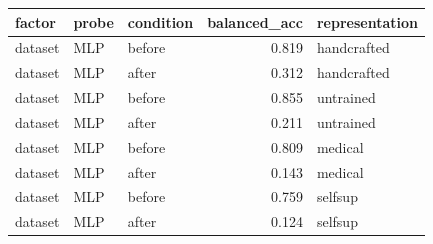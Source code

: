 \begin{tabular}{lllrl}
\toprule
factor & probe & condition & balanced\_acc & representation \\
\midrule
dataset & MLP & before & 0.819 & handcrafted \\
dataset & MLP & after & 0.312 & handcrafted \\
dataset & MLP & before & 0.855 & untrained \\
dataset & MLP & after & 0.211 & untrained \\
dataset & MLP & before & 0.809 & medical \\
dataset & MLP & after & 0.143 & medical \\
dataset & MLP & before & 0.759 & selfsup \\
dataset & MLP & after & 0.124 & selfsup \\
\bottomrule
\end{tabular}

